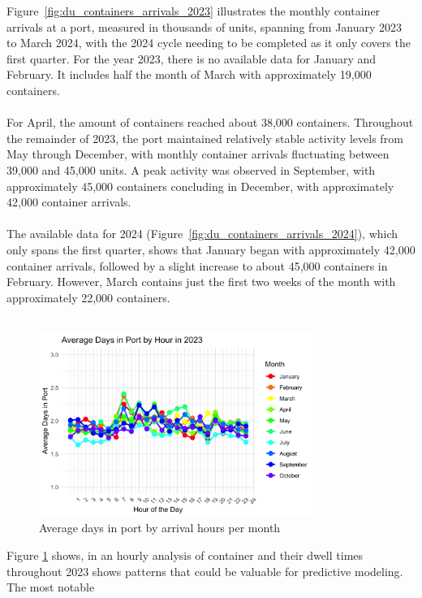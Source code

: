 			Figure~\ref{fig:du_containers_arrivals_2023}
			illustrates the monthly container arrivals at a port, measured in thousands of units, spanning
			from January 2023 to March 2024, with the 2024 cycle needing to be completed as it only covers the
			first quarter. For the year 2023, there is no available data for January and February. It includes
			half the month of March with approximately 19,000 containers.
			\\
			\\
			For April, the amount of containers reached about 38,000 containers. Throughout the remainder of
			2023, the port maintained relatively stable activity levels from May through December, with monthly
			container arrivals fluctuating between 39,000 and 45,000 units. A peak activity was observed in September,
			with approximately 45,000 containers concluding in December, with approximately 42,000 container arrivals.
			\\
			\\
			The available data for 2024 (Figure~\ref{fig:du_containers_arrivals_2024}), which only spans the first
			quarter, shows that January began with approximately 42,000 container arrivals, followed by a slight
			increase to about 45,000 containers in February. However, March contains just the first two weeks of the
			month with approximately 22,000 containers.
			\\
			\\
			\begin{figure}[ht]
				\centering
				\includegraphics[width=0.8\textwidth]{images/du_seven}
				\caption{Average days in port by arrival hours per month}
				\label{fig:hourly_arrivals}
			\end{figure}
			Figure \ref{fig:hourly_arrivals} shows, in an hourly analysis of container and their dwell
			times throughout 2023 shows patterns that could be valuable for predictive modeling. The most notable
